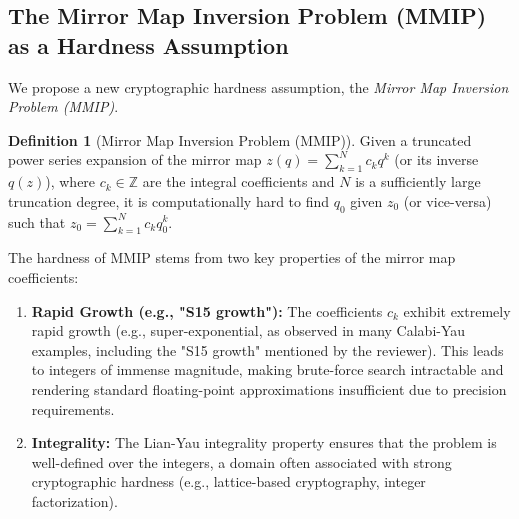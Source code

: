 \documentclass{book}
\newcommand{\qexp}{q} %
\newcommand{\zmod}{z} %
\theoremstyle{definition}
\newtheorem{definition}[theorem]{Definition}
\begin{document}
\subsection{The Mirror Map Inversion Problem (MMIP) as a Hardness Assumption}
We propose a new cryptographic hardness assumption, the \textit{Mirror Map Inversion Problem (MMIP)}.
\begin{definition}[Mirror Map Inversion Problem (MMIP)]
Given a truncated power series expansion of the mirror map $\zmod(\qexp) = \sum_{k=1}^N c_k \qexp^k$ (or its inverse $\qexp(\zmod)$), where $c_k \in \mathbb{Z}$ are the integral coefficients and $N$ is a sufficiently large truncation degree, it is computationally hard to find $\qexp_0$ given $\zmod_0$ (or vice-versa) such that $\zmod_0 = \sum_{k=1}^N c_k \qexp_0^k$.
\end{definition}
The hardness of MMIP stems from two key properties of the mirror map coefficients:
\begin{enumerate}
    \item \textbf{Rapid Growth (e.g., "S15 growth"):} The coefficients $c_k$ exhibit extremely rapid growth (e.g., super-exponential, as observed in many Calabi-Yau examples, including the "S15 growth" mentioned by the reviewer). This leads to integers of immense magnitude, making brute-force search intractable and rendering standard floating-point approximations insufficient due to precision requirements.
    \item \textbf{Integrality:} The Lian-Yau integrality property ensures that the problem is well-defined over the integers, a domain often associated with strong cryptographic hardness (e.g., lattice-based cryptography, integer factorization).
\end{enumerate}
\end{document}

